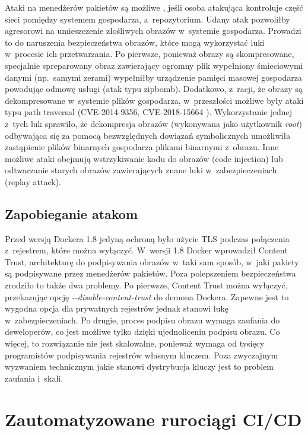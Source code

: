 Ataki na menedżerów pakietów są możliwe \cite{CapposAttacksOnPackageManagers}, jeśli osoba atakująca kontroluje część sieci pomiędzy systemem gospodarza, a~repozytorium. Udany atak pozwoliłby agresorowi na umieszczenie złośliwych obrazów w~systemie gospodarza. Prowadzi to do naruszenia bezpieczeństwa obrazów, które mogą wykorzystać luki w~procesie ich przetwarzania. Po pierwsze, ponieważ obrazy są skompresowane, specjalnie spreparowany obraz zawierający ogromny plik wypełniony śmieciowymi danymi (np.~samymi zerami) wypełniłby urządzenie pamięci masowej gospodarza powodując odmowę usługi (atak typu zipbomb). Dodatkowo, z~racji, że obrazy są dekompresowane w~systemie plików gospodarza, w~przeszłości możliwe były ataki typu path traversal (CVE-2014-9356, CVE-2018-15664 \cite{RedHatCVEDatabase}). Wykorzystanie jednej z~tych luk sprawiło, że dekompresja obrazów (wykonywana jako użytkownik \textit{root}) odbywająca się za pomocą bezwzględnych dowiązań symbolicznych umożliwiła zastąpienie plików binarnych gospodarza plikami binarnymi z~obrazu. Inne możliwe ataki obejmują wstrzykiwanie kodu do obrazów (code injection) lub odtwarzanie starych obrazów zawierających znane luki w~zabezpieczeniach (replay attack).

\subsection{Zapobieganie atakom}

Przed wersją Dockera 1.8 jedyną ochroną było użycie TLS podczas połączenia z~rejestrem, które można wyłączyć. W~wersji 1.8 Docker wprowadził Content Trust, architekturę do podpisywania obrazów w~taki sam sposób, w~jaki pakiety są podpisywane przez menedżerów pakietów. Poza polepszeniem bezpieczeństwa zrodziło to także dwa problemy. Po pierwsze, Content Trust można wyłączyć, przekazując opcję \textit{-{}-disable-content-trust} do demona Dockera. Zapewne jest to wygodna opcja dla prywatnych rejestrów jednak stanowi lukę w~zabezpieczeniach. Po drugie, proces podpisu obrazu wymaga zaufania do deweloperów, co jest możliwe tylko dzięki ujednoliceniu podpisu obrazu. Co więcej, to rozwiązanie nie jest skalowalne, ponieważ wymaga od tysięcy programistów podpisywania rejestrów własnym kluczem. Poza zwyczajnym wyzwaniem technicznym jakie stanowi dystrybucja kluczy jest to problem zaufania i~skali.

\section{Zautomatyzowane rurociągi CI/CD}

